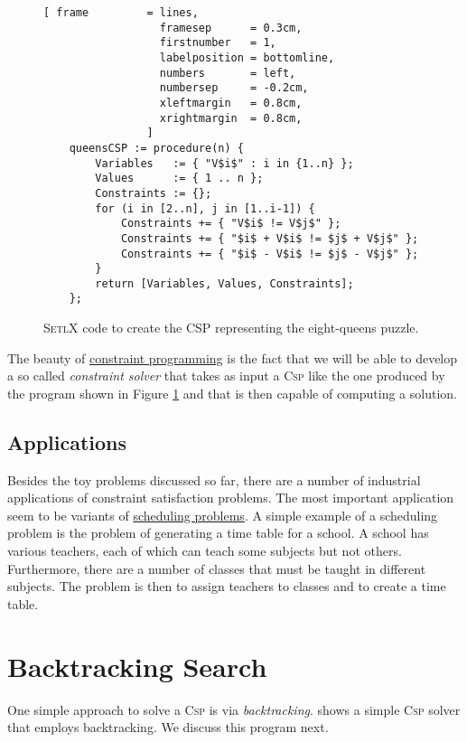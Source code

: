 \begin{figure}[!ht]
\centering
\begin{Verbatim}[ frame         = lines, 
                  framesep      = 0.3cm, 
                  firstnumber   = 1,
                  labelposition = bottomline,
                  numbers       = left,
                  numbersep     = -0.2cm,
                  xleftmargin   = 0.8cm,
                  xrightmargin  = 0.8cm,
                ]
    queensCSP := procedure(n) {
        Variables   := { "V$i$" : i in {1..n} };
        Values      := { 1 .. n };
        Constraints := {};
        for (i in [2..n], j in [1..i-1]) {
            Constraints += { "V$i$ != V$j$" };
            Constraints += { "$i$ + V$i$ != $j$ + V$j$" };
            Constraints += { "$i$ - V$i$ != $j$ - V$j$" };
        }
        return [Variables, Values, Constraints];
    };
\end{Verbatim}
\vspace*{-0.3cm}
\caption{\textsc{SetlX} code to create the CSP representing the eight-queens puzzle.}
\label{fig:queens-csp.stlx}
\end{figure}

The beauty of \href{https://en.wikipedia.org/wiki/Constraint_programming}{constraint programming} is the fact
that we will be able to develop a so called \emph{\color{blue}constraint solver} that takes as input a \textsc{Csp}
like the one produced by the program shown in Figure \ref{fig:queens-csp.stlx} and that is then capable of
computing a solution. 

\subsection{Applications}
Besides the toy problems discussed so far, there are a number of industrial applications of constraint
satisfaction problems.  The most important application seem to be variants of
\href{https://en.wikipedia.org/wiki/Scheduling_(production_processes)}{scheduling problems}. 
A simple example of a scheduling problem is the problem of generating a time table for a school.  A school has
various teachers, each of which can teach some subjects but not others.  Furthermore, there are a number of
classes that must be taught in different subjects.  The problem is then to assign teachers to classes and to
create a time table.


\section{Backtracking Search}
One simple approach to solve a \textsc{Csp} is via \emph{\color{blue}backtracking}.
 shows a simple \textsc{Csp} solver that employs backtracking.  We discuss
this program next.

